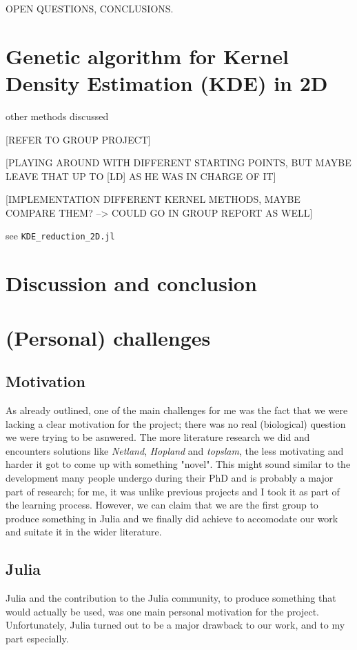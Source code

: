 \documentclass[journal, a4paper]{IEEEtran}
\begin{document}
OPEN QUESTIONS, CONCLUSIONS.


\section{Genetic algorithm for Kernel Density Estimation (KDE) in 2D}

other methods discussed

[REFER TO GROUP PROJECT]

[PLAYING AROUND WITH DIFFERENT STARTING POINTS, BUT MAYBE LEAVE THAT UP TO [LD] AS HE WAS IN CHARGE OF IT]

[IMPLEMENTATION DIFFERENT KERNEL METHODS, MAYBE COMPARE THEM? --> COULD GO IN GROUP REPORT AS WELL]

see \texttt{KDE\_reduction\_2D.jl}

\section{Discussion and conclusion}




\section{(Personal) challenges}

\subsection{Motivation}
As already outlined, one of the main challenges for me was the fact that we were lacking a clear motivation for the project; there was no real (biological) question we were trying to be asnwered. The more literature research we did and encounters solutions like \textit{Netland}, \textit{Hopland} and \textit{topslam}, the less motivating and harder it got to come up with something "novel". This might sound similar to the development many people undergo during their PhD and is probably a major part of research; for me, it was unlike previous projects and I took it as part of the learning process.
However, we can claim that we are the first group to produce something in Julia and we finally did achieve to accomodate our work and suitate it in the wider literature. 


\subsection{Julia}
Julia and the contribution to the Julia community, to produce something that would actually be used, was one main personal motivation for the project. Unfortunately, Julia turned out to be a major drawback to our work, and to my part especially.
\end{document}
